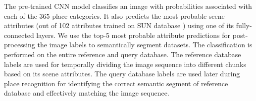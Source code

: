\documentclass[letterpaper, 10 pt, conference]{ieeeconf}  %
\begin{document}
The pre-trained CNN model classifies an image with probabilities associated with each of the 365 place categories. It also predicts the most probable scene attributes (out of 102 attributes trained on SUN database \cite{Patterson2012SunAttributes}) using one of its fully-connected layers. We use the top-5 most probable attribute predictions for post-processing the image labels to semantically segment datasets. The classification is performed on the entire reference and query database. The reference database labels are used for temporally dividing the image sequence into different chunks based on its scene attributes. The query database labels are used later during place recognition for identifying the correct semantic segment of reference database and effectively matching the image sequence.

\newcommand{\scaleVal}{0.28}
\end{document}
